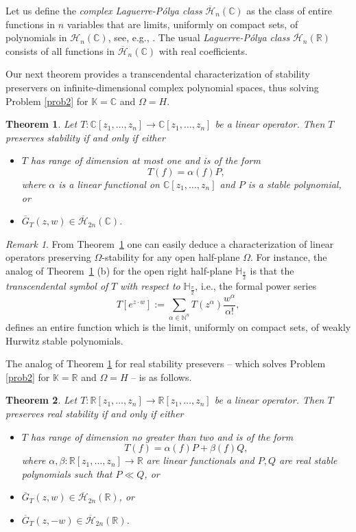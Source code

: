 \documentclass[10pt,reqno]{amsart}
\theoremstyle{plain}
\newtheorem{theorem}{Theorem}[section]
\theoremstyle{definition}
\theoremstyle{remark}
\newtheorem{remark}{Remark}[section]
\numberwithin{equation}{section}
\newcommand{\NN}{\mathbb{N}}
\newcommand{\bH}{\mathbb{H}}
\newcommand{\HH}{\mathcal{H}}
\newcommand{\HHH}{\overline{\mathcal{H}}}
\newcommand{\RR}{\mathbb{R}}
\newcommand{\CC}{\mathbb{C}}
\newcommand{\KK}{\mathbb{K}}
\begin{document}
Let us define the {\em complex Laguerre-P\'olya class} $\HHH_n(\CC)$ as 
the class of entire functions in $n$ variables that are limits, uniformly on 
compact sets, of polynomials in $\HH_n(\CC)$, see, e.g., \cite[Chap.~IX]{Le}. 
The usual {\em Laguerre-P\'olya class} $\HHH_n(\RR)$ consists of all 
functions in $\HHH_n(\CC)$ with real coefficients.

Our next theorem provides a transcendental characterization of stability
preservers on infinite-dimensional complex polynomial spaces, thus solving 
Problem \ref{prob2} for $\KK=\CC$ and $\Omega=H$.

\begin{theorem}\label{multi-infinite-stab}
Let $T : \CC[z_1,\ldots, z_n] \rightarrow \CC[z_1,\ldots, z_n]$ be a 
linear operator. Then $T$ preserves stability if and only if either
\begin{itemize}
\item[(a)] $T$ has range of dimension at most one and is of the form 
$$
T(f) = \alpha(f)P,
$$
where $\alpha$ is a linear functional on $\CC[z_1,\ldots, z_n]$ and $P$ is a 
stable polynomial, or 
\item[(b)] $\overline{G}_T(z,w)\in \HHH_{2n}(\CC)$. 
\end{itemize}
\end{theorem}

\begin{remark}\label{lhp}
From Theorem~\ref{multi-infinite-stab} one can easily deduce a 
characterization of linear operators preserving $\Omega$-stability for any 
open half-plane $\Omega$. For instance, the analog of 
Theorem~\ref{multi-infinite-stab} (b) for the open right half-plane 
$\bH_{\frac{\pi}{2}}$ is that the {\em transcendental symbol of} $T$ {\em 
with respect to} $\bH_{\frac{\pi}{2}}$, i.e., the formal power series 
$$
T[e^{z\cdot w}]:=\sum_{\alpha \in \NN^n}T(z^\alpha)\frac {w^\alpha}{\alpha!}, 
$$
defines an entire function which is the limit, uniformly on compact sets, of 
weakly Hurwitz stable polynomials. 
\end{remark}

The analog of Theorem \ref{multi-infinite-stab} for real stability presevers
-- which solves 
Problem \ref{prob2} for $\KK=\RR$ and $\Omega=H$ -- is as follows.

\begin{theorem}\label{multi-infinite-hyp}
Let $T : \RR[z_1,\ldots, z_n] \rightarrow \RR[z_1,\ldots, z_n]$ be a linear 
operator. Then $T$ preserves real stability if and only if either
\begin{itemize}
\item[(a)] $T$ has range of dimension no greater than two and is of the form 
$$
T(f) = \alpha(f)P + \beta(f)Q,
$$
where $\alpha, \beta: \RR[z_1,\ldots, z_n] \rightarrow \RR$ are linear 
functionals and $P,Q$ are real stable polynomials such that $P \ll Q$, or 
\item[(b)] $\overline{G}_T(z,w)\in \HHH_{2n}(\RR)$, or 
\item[(c)] $\overline{G}_T(z,-w)\in \HHH_{2n}(\RR)$. 
\end{itemize}
\end{theorem}
\end{document}
